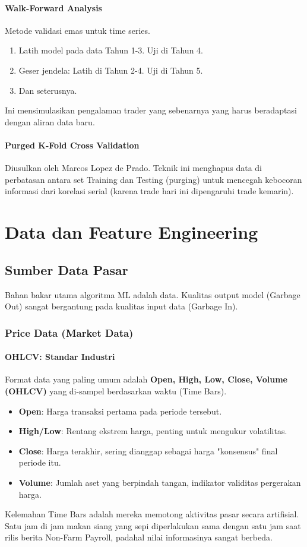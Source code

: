 \documentclass[12pt,a4paper]{book}
\begin{document}
\subsection{Walk-Forward Analysis}
Metode validasi emas untuk time series.
\begin{enumerate}
    \item Latih model pada data Tahun 1-3. Uji di Tahun 4.
    \item Geser jendela: Latih di Tahun 2-4. Uji di Tahun 5.
    \item Dan seterusnya.
\end{enumerate}
Ini mensimulasikan pengalaman trader yang sebenarnya yang harus beradaptasi dengan aliran data baru.

\subsection{Purged K-Fold Cross Validation}
Diusulkan oleh Marcos Lopez de Prado. Teknik ini menghapus data di perbatasan antara set Training dan Testing (purging) untuk mencegah kebocoran informasi dari korelasi serial (karena trade hari ini dipengaruhi trade kemarin).

\part{Data dan Feature Engineering}

\chapter{Sumber Data Pasar}
Bahan bakar utama algoritma ML adalah data. Kualitas output model (Garbage Out) sangat bergantung pada kualitas input data (Garbage In).

\section{Price Data (Market Data)}
\subsection{OHLCV: Standar Industri}
Format data yang paling umum adalah \textbf{Open, High, Low, Close, Volume (OHLCV)} yang di-sampel berdasarkan waktu (Time Bars).
\begin{itemize}
    \item \textbf{Open}: Harga transaksi pertama pada periode tersebut.
    \item \textbf{High/Low}: Rentang ekstrem harga, penting untuk mengukur volatilitas.
    \item \textbf{Close}: Harga terakhir, sering dianggap sebagai harga "konsensus" final periode itu.
    \item \textbf{Volume}: Jumlah aset yang berpindah tangan, indikator validitas pergerakan harga.
\end{itemize}
Kelemahan Time Bars adalah mereka memotong aktivitas pasar secara artifisial. Satu jam di jam makan siang yang sepi diperlakukan sama dengan satu jam saat rilis berita Non-Farm Payroll, padahal nilai informasinya sangat berbeda.
\end{document}
